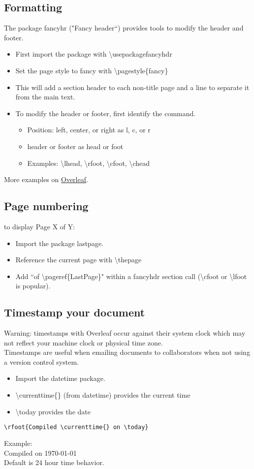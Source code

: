 \documentclass[11pt]{article}
\begin{document}
\subsection{Formatting}
The package fancyhr ("Fancy header``) provides tools to modify the header and footer.
\begin{itemize}
	\item First import the package with \textbackslash usepackage{fancyhdr}
	\item Set the page style to fancy with \textbackslash pagestyle\{fancy\}
	\item This will add a section header to each non-title page and a line to separate it from the main text.
	\item To modify the header or footer, first identify the command.
	\begin{itemize}
		\item Position: left, center, or right as l, c, or r
		\item header or footer as head or foot
		\item Examples: \textbackslash lhead, \textbackslash rfoot, \textbackslash cfoot, \textbackslash chead
	\end{itemize}

\end{itemize}
More examples on \href{https://www.overleaf.com/learn/latex/headers_and_footers}{Overleaf}.
\subsection{Page numbering}
to display Page X of Y:
\begin{itemize}
\item Import the package lastpage.
\item Reference the current page with \textbackslash thepage
\item Add ``\thepage of \textbackslash pageref\{LastPage\}" within a fancyhdr section call (\textbackslash cfoot or \textbackslash lfoot is popular).
\end{itemize}
\subsection{Timestamp your document}
Warning: timestamps with Overleaf occur against their system clock which may not reflect your machine clock or physical time zone. \\
Timestamps are useful when emailing documents to collaborators when not using a version control system. 
\begin{itemize}
	\item Import the datetime package.
	\item \textbackslash currenttime\{\} (from datetime) provides the current time
	\item \textbackslash today provides the date
\end{itemize}
\begin{verbatim}
\rfoot{Compiled \currenttime{} on \today}
\end{verbatim} 
Example: \\
Compiled \currenttime{} on \today \\
Default is 24 hour time behavior.
\end{document}
